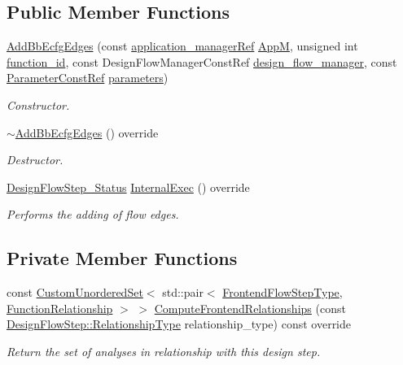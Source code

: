 \subsection*{Public Member Functions}
\begin{DoxyCompactItemize}
\item 
\hyperlink{classAddBbEcfgEdges_a8305f7f604fc970848c20f6b8af41416}{Add\+Bb\+Ecfg\+Edges} (const \hyperlink{application__manager_8hpp_a04ccad4e5ee401e8934306672082c180}{application\+\_\+manager\+Ref} \hyperlink{classFrontendFlowStep_a0ac0d8db2a378416583f51c4faa59d15}{AppM}, unsigned int \hyperlink{classFunctionFrontendFlowStep_a58ef2383ad1a212a8d3f396625a4b616}{function\+\_\+id}, const Design\+Flow\+Manager\+Const\+Ref \hyperlink{classDesignFlowStep_ab770677ddf087613add30024e16a5554}{design\+\_\+flow\+\_\+manager}, const \hyperlink{Parameter_8hpp_a37841774a6fcb479b597fdf8955eb4ea}{Parameter\+Const\+Ref} \hyperlink{classDesignFlowStep_a802eaafe8013df706370679d1a436949}{parameters})
\begin{DoxyCompactList}\small\item\em Constructor. \end{DoxyCompactList}\item 
\hyperlink{classAddBbEcfgEdges_a2a2bac0c88dae905633dbccd7bc11e21}{$\sim$\+Add\+Bb\+Ecfg\+Edges} () override
\begin{DoxyCompactList}\small\item\em Destructor. \end{DoxyCompactList}\item 
\hyperlink{design__flow__step_8hpp_afb1f0d73069c26076b8d31dbc8ebecdf}{Design\+Flow\+Step\+\_\+\+Status} \hyperlink{classAddBbEcfgEdges_a68e4d52d843953b82aa4faf47c2585a1}{Internal\+Exec} () override
\begin{DoxyCompactList}\small\item\em Performs the adding of flow edges. \end{DoxyCompactList}\end{DoxyCompactItemize}
\subsection*{Private Member Functions}
\begin{DoxyCompactItemize}
\item 
const \hyperlink{classCustomUnorderedSet}{Custom\+Unordered\+Set}$<$ std\+::pair$<$ \hyperlink{frontend__flow__step_8hpp_afeb3716c693d2b2e4ed3e6d04c3b63bb}{Frontend\+Flow\+Step\+Type}, \hyperlink{classFrontendFlowStep_af7cf30f2023e5b99e637dc2058289ab0}{Function\+Relationship} $>$ $>$ \hyperlink{classAddBbEcfgEdges_a25f0dc82c0ee76dbb23ee6562d87b81d}{Compute\+Frontend\+Relationships} (const \hyperlink{classDesignFlowStep_a723a3baf19ff2ceb77bc13e099d0b1b7}{Design\+Flow\+Step\+::\+Relationship\+Type} relationship\+\_\+type) const override
\begin{DoxyCompactList}\small\item\em Return the set of analyses in relationship with this design step. \end{DoxyCompactList}\end{DoxyCompactItemize}
